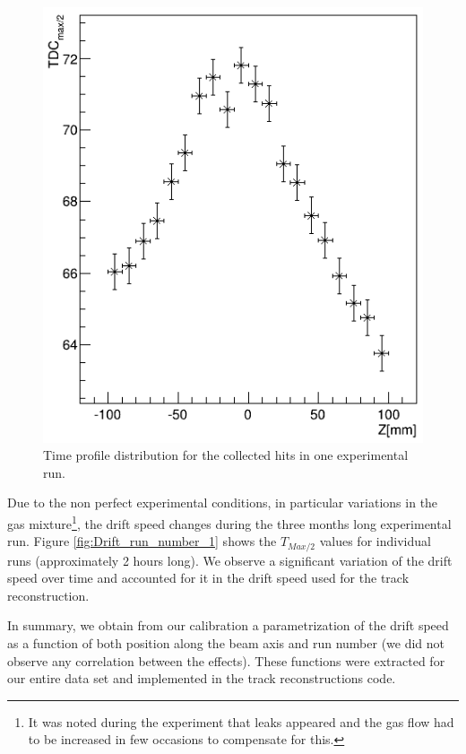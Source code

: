 \documentclass[twocolumn,showpacs,superscriptaddress,groupedaddress]{revtex4}
\begin{document}
\begin{figure}[tb]
\centering
\includegraphics[scale=0.36]{fig/RunNumber_61551_TDCmax_Zslice.png}
\caption{Time profile distribution for the collected hits in one experimental 
run. } \label{fig:RunNumber_61551_TDCmax_Zslice}
\end{figure}

Due to the non perfect experimental conditions, in particular variations in the 
gas mixture\footnote{It was noted during the experiment that leaks appeared
and the gas flow had to be increased in few occasions to compensate for this.}, 
the drift speed changes during the three months long experimental run.  
Figure \ref{fig:Drift_run_number_1} shows the $T_{Max/2}$ values for 
individual runs (approximately 2 hours long). We observe a significant 
variation of the drift speed over time and accounted for it in the drift 
speed used for the track reconstruction. 

In summary, we obtain from our calibration a parametrization of the drift speed 
as a function of both position along the beam axis and run number (we did not 
observe any correlation between the effects). These 
functions were extracted for our entire data set and implemented in the 
track reconstructions code.
\end{document}
